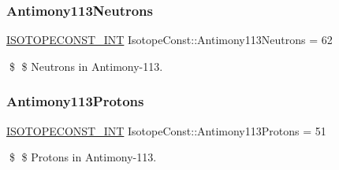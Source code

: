 \subsubsection{\texorpdfstring{Antimony113\+Neutrons}{Antimony113Neutrons}}
{\footnotesize\ttfamily \mbox{\hyperlink{group___isotope_const-_macros_ga5f18360b3e99483a35c32d789e62621c}{I\+S\+O\+T\+O\+P\+E\+C\+O\+N\+S\+T\+\_\+\+I\+NT}} Isotope\+Const\+::\+Antimony113\+Neutrons = 62}

\$ \$ Neutrons in Antimony-\/113. \mbox{\label{group___isotope_const-_antimony-_sb113_gaa2592c97bc043b51ffa35ad133049591}} 
\subsubsection{\texorpdfstring{Antimony113\+Protons}{Antimony113Protons}}
{\footnotesize\ttfamily \mbox{\hyperlink{group___isotope_const-_macros_ga5f18360b3e99483a35c32d789e62621c}{I\+S\+O\+T\+O\+P\+E\+C\+O\+N\+S\+T\+\_\+\+I\+NT}} Isotope\+Const\+::\+Antimony113\+Protons = 51}

\$ \$ Protons in Antimony-\/113. 
